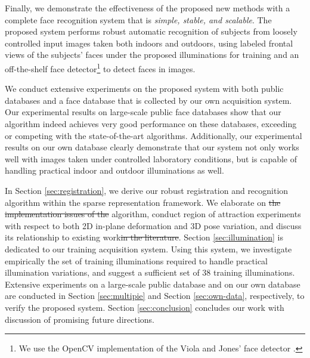 \documentclass[12pt,journal,draftcls,letterpaper,onecolumn]{IEEEtran}
\providecommand{\DIFadd}[1]{{\protect\color{blue}\uwave{#1}}} %
\providecommand{\DIFdel}[1]{{\protect\color{red}\sout{#1}}}                      %
\providecommand{\DIFaddbegin}{} %
\providecommand{\DIFaddend}{} %
\providecommand{\DIFdelbegin}{} %
\providecommand{\DIFdelend}{} %
\begin{document}


Finally, we demonstrate the effectiveness of the proposed new
methods with a complete face recognition system that is {\em
simple, stable, and scalable}. The proposed system performs
robust automatic recognition of subjects from loosely
controlled input images taken both indoors and outdoors, using
labeled frontal views of the subjects' faces under the proposed
illuminations for training and an off-the-shelf face
detector\footnote{We use the OpenCV
implementation of the Viola and Jones' face detector
\cite{Viola2004-IJCV}.} to detect faces in images.

We conduct extensive experiments on the proposed system with
both public databases and a face database that is collected by
our own acquisition system. Our experimental results on
large-scale public face databases show that our algorithm
indeed achieves very good performance on these databases,
exceeding or competing with the state-of-the-art algorithms. 
Additionally, our experimental results on our own database
clearly demonstrate that our system not only works well with
images taken under controlled laboratory conditions, but is
capable of handling practical indoor and outdoor illuminations as well.

\DIFdelbegin %
\DIFdelend \DIFaddbegin {} \DIFaddend In Section
\ref{sec:registration}, we derive our robust registration and
recognition algorithm within the sparse representation
framework. We elaborate on \DIFdelbegin \DIFdel{the implementation issues of the
}\DIFdelend \DIFaddbegin \DIFadd{implementation issues with our }\DIFaddend algorithm, conduct region of attraction experiments with
respect to both 2D in-plane deformation and 3D pose variation,
and discuss its relationship to existing work\DIFdelbegin \DIFdel{in the
literature}\DIFdelend . Section \ref{sec:illumination} is dedicated to our
training acquisition system. Using this system, we investigate empirically the set of training illuminations required to handle practical illumination variations, and suggest a sufficient set of 38 training illuminations. Extensive experiments on
a large-scale public database and on our own database are conducted
in Section \ref{sec:multipie} and Section \ref{sec:own-data},
respectively, to verify the proposed system. Section
\ref{sec:conclusion} concludes our work with discussion of
promising future directions.
\end{document}
